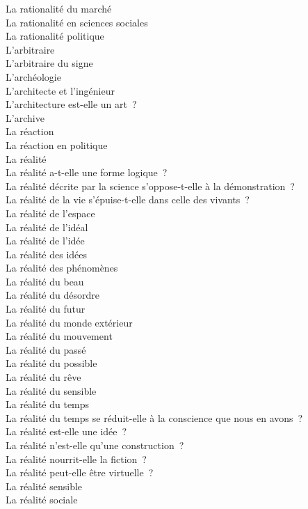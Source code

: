 \documentclass[a4paper,12pt]{article}
\begin{document}
La rationalité du marché \\
La rationalité en sciences sociales \\
La rationalité politique \\
L'arbitraire \\
L'arbitraire du signe \\
L'archéologie \\
L'architecte et l'ingénieur \\
L'architecture est-elle un art ? \\
L'archive \\
La réaction \\
La réaction en politique \\
La réalité \\
La réalité a-t-elle une forme logique ? \\
La réalité décrite par la science s'oppose-t-elle à la démonstration ? \\
La réalité de la vie s'épuise-t-elle dans celle des vivants ? \\
La réalité de l'espace \\
La réalité de l'idéal \\
La réalité de l'idée \\
La réalité des idées \\
La réalité des phénomènes \\
La réalité du beau \\
La réalité du désordre \\
La réalité du futur \\
La réalité du monde extérieur \\
La réalité du mouvement \\
La réalité du passé \\
La réalité du possible \\
La réalité du rêve \\
La réalité du sensible \\
La réalité du temps \\
La réalité du temps se réduit-elle à la conscience que nous en avons ? \\
La réalité est-elle une idée ? \\
La réalité n'est-elle qu'une construction ? \\
La réalité nourrit-elle la fiction ? \\
La réalité peut-elle être virtuelle ? \\
La réalité sensible \\
La réalité sociale \\
\end{document}
